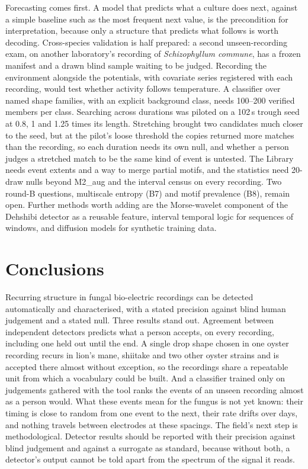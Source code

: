Forecasting comes first. A model that predicts what a culture does next, against a simple baseline such as the most frequent next value, is the precondition for interpretation, because only a structure that predicts what follows is worth decoding. Cross-species validation is half prepared: a second unseen-recording exam, on another laboratory's recording of \emph{Schizophyllum commune}, has a frozen manifest and a drawn blind sample waiting to be judged. Recording the environment alongside the potentials, with covariate series registered with each recording, would test whether activity follows temperature. A classifier over named shape families, with an explicit background class, needs 100--200 verified members per class. Searching across durations was piloted on a 102\,s trough seed at 0.8, 1 and 1.25 times its length. Stretching brought two candidates much closer to the seed, but at the pilot's loose threshold the copies returned more matches than the recording, so each duration needs its own null, and whether a person judges a stretched match to be the same kind of event is untested. The Library needs event extents and a way to merge partial motifs, and the statistics need 20-draw nulls beyond M2\_aug and the interval census on every recording. Two round-B questions, multiscale entropy (B7) and motif prevalence (B8), remain open. Further methods worth adding are the Morse-wavelet component of the Dehshibi detector as a reusable feature, interval temporal logic for sequences of windows, and diffusion models for synthetic training data.

\section{Conclusions}

Recurring structure in fungal bio-electric recordings can be detected automatically and characterised, with a stated precision against blind human judgement and a stated null. Three results stand out. Agreement between independent detectors predicts what a person accepts, on every recording, including one held out until the end. A single drop shape chosen in one oyster recording recurs in lion's mane, shiitake and two other oyster strains and is accepted there almost without exception, so the recordings share a repeatable unit from which a vocabulary could be built. And a classifier trained only on judgements gathered with the tool ranks the events of an unseen recording almost as a person would. What these events mean for the fungus is not yet known: their timing is close to random from one event to the next, their rate drifts over days, and nothing travels between electrodes at these spacings. The field's next step is methodological. Detector results should be reported with their precision against blind judgement and against a surrogate as standard, because without both, a detector's output cannot be told apart from the spectrum of the signal it reads.
